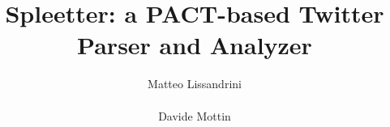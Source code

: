 \documentclass{acm_proc_article-sp}
\begin{document}
\title{Spleetter: a PACT-based Twitter Parser and Analyzer}


\author{
\alignauthor
Matteo Lissandrini\\
       \\
\alignauthor
Davide Mottin\\
      \\
}


\maketitle

\pagestyle{plain}
\maketitle
\begin{abstract}

\end{abstract}

%
%








%
%


\def\thebibliography#1{
  \section*{References}
 \scriptsize
  \list
    {[\arabic{enumi}]}
    {\settowidth\labelwidth{[#1]}
     \leftmargin\labelwidth
     \parsep 1pt                %
     \itemsep 0.6pt               %
     \advance\leftmargin\labelsep
     \usecounter{enumi}
    }
  \def\newblock{\hskip .11em plus .33em minus .07em}
  \sloppy\clubpenalty10000\widowpenalty10000
  \sfcode`\.=1000\relax
}

  
\end{document}
